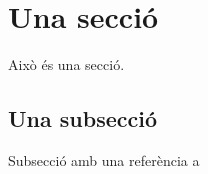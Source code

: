 \section{Una secció}
Això és una secció.

\subsection{Una subsecció}
Subsecció amb una referència a \cite{bib1}